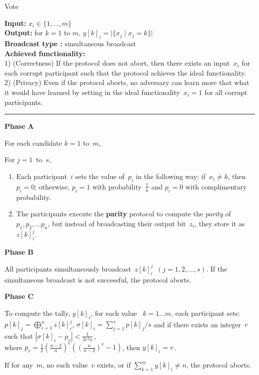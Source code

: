 \documentclass[11pt]{article}
\providecommand{\abs}[1]{\lvert#1\rvert}
\begin{document}
\begin{protocol}
 \caption{Vote} \label{prot:vote}

{\bf Input:} $x_i \in \{1,\ldots,m\}$ \\
{\bf Output:} for $k=1$ to $m$, $y[k]_i= \abs{\{x_j \mid x_j=k \}}$  \\
{\bf Broadcast type :} simultaneous broadcast\\
{\bf Achieved functionality:} \\
1) (Correctness) If the protocol does not abort, then there exists
an input~$x_i$ for
each corrupt participant such that the protocol achieves the ideal functionality. \\
2) (Privacy) Even if the protocol aborts, no adversary can  learn
more that what it would have learned by setting in the ideal
functionality~$x_i=1$ for all corrupt participants.

 \vspace{4pt} \hrule \vspace{4pt}

\textbf{Phase A}

For each candidate $k=1$ to~$m$,


\hspace{0.3cm} For $j=1$~to~$s$,
\begin{enumerate}
\item \label{step:flip-1}Each participant~$i$ sets the value of~$p_i$ in the
following way: if~$x_i \neq k$, then $p_i=0$; otherwise, $p_i=1$
with probability~$\frac{1}{n}$ and $p_i=0$ with complimentary
probability.
\item \label{step:parity} The participants execute the \textbf{parity} protocol to
compute the \emph{parity} of $p_1, p_2, \ldots p_n$, but instead of
broadcasting their output bit~$z_i$, they store it as~$z[k]_i^j$.
\end{enumerate}

\textbf{Phase B}

All participants simultaneously broadcast~$z[k]_i^j$~$(j=1,2,\ldots,
s)$.
If the simultaneous broadcast is not successful, the protocol aborts. \\

\vspace{-.4cm}

\textbf{Phase C}

 To compute the tally, $y[k]_i$, for each value
~$k=1 \ldots m$, each participant sets:
\mbox{$p[k]_j=\bigoplus_{i=1}^n z[k]_i^j$}, \mbox{$\sigma[k]_i =
\sum_{j=1}^s p[k]_j/s$} and  if there exists an integer~$v$ such
that $\left|\sigma[k]_i - p_v \right| < \frac{1}{2e^2n} \,$, \\
where $p_v = \frac{1}{2}\left(\frac{n-2}{n}\right)^v
\left(\left(\frac{n}{n-2}\right)^v -1\right)$, then $y[k]_i=v$\,.

If for any~$m$, no such value~$v$ exists, or if $\sum_{k=1}^m y[k]_i
\neq n$, the protocol aborts.

\end{protocol}
\end{document}
